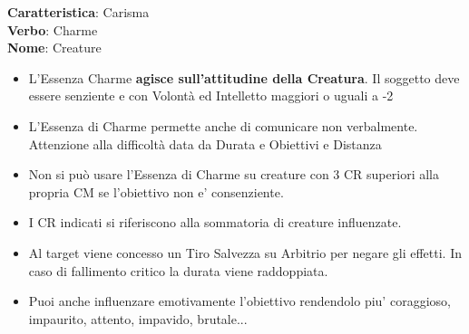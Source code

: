 \documentclass[a4paper,10 pt,twoside,openany]{book}
\begin{document}
\textbf{Caratteristica}: Carisma\\
\textbf{Verbo}: Charme\\
\textbf{Nome}: Creature\\

\label{essenza-charme---magnetismo}

\begin{itemize}
	\item
	L'Essenza Charme \textbf{agisce sull'attitudine della Creatura}. Il soggetto deve essere senziente e con Volontà ed Intelletto maggiori o uguali a -2
	\item
	L'Essenza di Charme permette anche di comunicare non verbalmente. Attenzione alla difficoltà data da Durata e Obiettivi e Distanza
	\item
	Non si può usare l'Essenza di Charme su creature con 3 CR superiori alla propria CM se l'obiettivo non e' consenziente.
	\item
	I CR indicati si riferiscono alla sommatoria di creature influenzate.
	\item
	Al target viene concesso un Tiro Salvezza su Arbitrio per negare gli effetti. In caso di fallimento critico la durata viene raddoppiata.
	\item
	Puoi anche influenzare emotivamente l'obiettivo rendendolo piu' coraggioso, impaurito, attento, impavido, brutale...
\end{itemize}

\medskip
\end{document}
